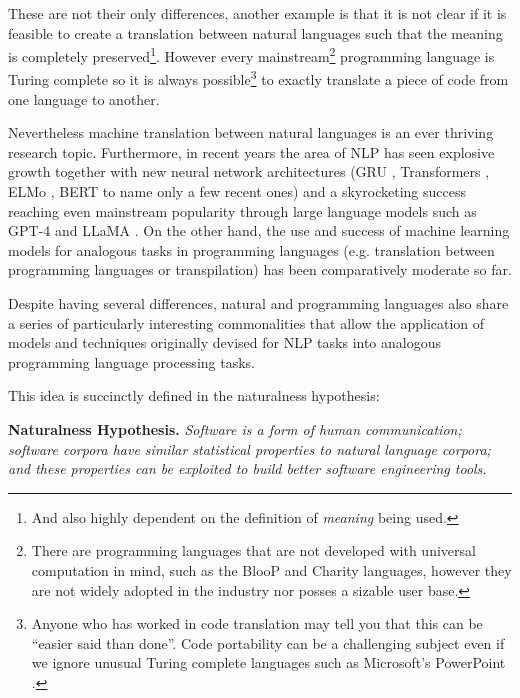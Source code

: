 These are not their only differences, another example is that it is not clear if it is feasible to create a translation between natural languages such that the meaning is completely preserved\footnote{And also highly dependent on the definition of \textit{meaning} being used.}. However every mainstream\footnote{There are programming languages that are not developed with universal computation in mind, such as the BlooP \citep{bloop} and Charity \citep{charity} languages, however they are not widely adopted in the industry nor posses a sizable user base.} programming language is Turing complete \citep{turing} so it is always possible\footnote{Anyone who has worked in code translation may tell you that this can be ``easier said than done''. Code portability can be a challenging subject even if we ignore unusual Turing complete languages such as Microsoft's PowerPoint \citep{ppt}.} to exactly translate a piece of code from one language to another.

Nevertheless machine translation between natural languages is an ever thriving research topic. Furthermore, in recent years the area of NLP has seen explosive growth together with new neural network architectures (GRU \citep{GRU}, Transformers \citep{attention_is_all_you_need}, ELMo \citep{ELMo}, BERT \citep{BERT} to name only a few recent ones) and a skyrocketing success reaching even mainstream popularity through large language models such as GPT-4 \citep{gpt4} and LLaMA \citep{llama}. On the other hand, the use and success of machine learning models for analogous tasks in programming languages (e.g. translation between programming languages or transpilation) has been comparatively moderate so far.



Despite having several differences, natural and programming languages also share a series of particularly interesting commonalities that allow the application of models and techniques originally devised for NLP tasks into analogous programming language processing tasks.






This idea is succinctly defined in the naturalness hypothesis:


\begin{myquote}
\textbf{Naturalness Hypothesis. }
\textit{
Software is a form of human communication; software corpora have similar statistical properties to natural language corpora; and these properties can be exploited to build better software engineering tools.}  \\\citet{allamanis2018survey}
\end{myquote}

